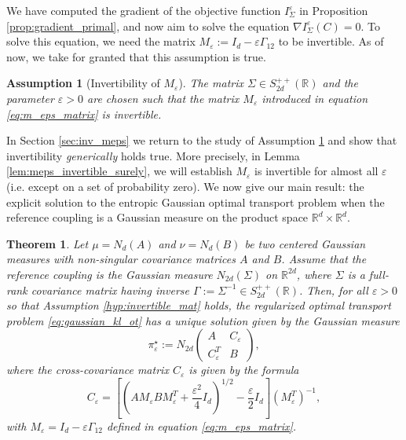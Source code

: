 \documentclass[]{article}
\numberwithin{equation}{section}
\theoremstyle{plain}
\newtheorem{thm}{Theorem}[section]
\newtheorem{hyp}{Assumption}[section]
\begin{document}
We have computed the gradient of the objective function $I_\Sigma^{\varepsilon}$ in Proposition \ref{prop:gradient_primal}, and now aim to solve the equation $\nabla I_\Sigma^\varepsilon(C) =0$. To solve this equation, we need the matrix $ M_\varepsilon :=  I_d - \varepsilon \Gamma_{12}$ to be invertible. As of now, we take for granted that this assumption is true.
\begin{hyp}[Invertibility of $M_\varepsilon$]\label{hyp:invertible_mat}
	The matrix $\Sigma \in S_{2d}^{++}(\mathbb{R})$ and the parameter $\varepsilon > 0$ are chosen such that the matrix $M_\varepsilon$ introduced in equation \eqref{eq:m_eps_matrix} is invertible.
\end{hyp}
In Section \ref{sec:inv_meps} we return to the study of Assumption \ref{hyp:invertible_mat} and show that invertibility \emph{generically} holds true. More precisely, in Lemma \ref{lem:meps_invertible_surely}, we will establish  $M_{\varepsilon}$ is invertible for almost all $\varepsilon$ (i.e. except on a set of probability zero).
We now give our main result: the explicit solution to the entropic Gaussian optimal transport problem when the reference coupling is a Gaussian measure on the product space $\mathbb{R}^d \times \mathbb{R}^d$.


\begin{thm}\label{thm:closed_form_gauss}
    Let $\mu=N_d(A)$ and $\nu = N_d(B)$ be two centered Gaussian measures with non-singular covariance matrices $A$ and $B$. Assume that the reference coupling is the Gaussian measure $N_{2d}(\Sigma)$ on $\mathbb{R}^{2d}$, where $\Sigma$ is a full-rank covariance matrix having inverse $\Gamma := \Sigma^{-1} \in S_{2d}^{++}(\mathbb{R})$. Then, for all $\varepsilon > 0$ so that Assumption \eqref{hyp:invertible_mat} holds, the regularized optimal transport problem \eqref{eq:gaussian_kl_ot} has a unique solution given by the Gaussian measure
    \begin{equation}
    \pi_\varepsilon^{\star} := N_{2d}\begin{pmatrix}
        A & C_\varepsilon\\
        C_\varepsilon^T& B
    \end{pmatrix},
    \end{equation}
    where the cross-covariance matrix $C_\varepsilon$ is given by the formula
    \begin{equation}
        C_\varepsilon =\left[\left( AM_\varepsilon BM_\varepsilon^T +\frac{\varepsilon^2}{4}I_d\right)^{1/2} - \frac{\varepsilon}{2}I_d \right](M_\varepsilon^T)^{-1},
    \end{equation}
with $M_\varepsilon=I_d - \varepsilon \Gamma_{12}$ defined in equation \eqref{eq:m_eps_matrix}.
\end{thm}
\end{document}
